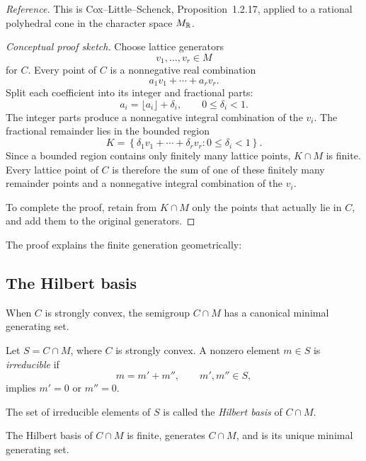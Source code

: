 \noindent
\textit{Reference.}
This is Cox--Little--Schenck, Proposition~1.2.17, applied to a
rational polyhedral cone in the character space \(M_{\mathbb{R}}\).

\begin{proof}[Conceptual proof sketch]
Choose lattice generators
\[
v_1,\ldots,v_r\in M
\]
for \(C\). Every point of \(C\) is a nonnegative real combination
\[
a_1v_1+\cdots+a_rv_r.
\]
Split each coefficient into its integer and fractional parts:
\[
a_i=\lfloor a_i\rfloor+\delta_i,
\qquad
0\leq\delta_i<1.
\]
The integer parts produce a nonnegative integral combination of the
\(v_i\). The fractional remainder lies in the bounded region
\[
K=
\left\{
\delta_1v_1+\cdots+\delta_rv_r:
0\leq\delta_i<1
\right\}.
\]
Since a bounded region contains only finitely many lattice points,
\(K\cap M\) is finite. Every lattice point of \(C\) is therefore the
sum of one of these finitely many remainder points and a nonnegative
integral combination of the \(v_i\).

To complete the proof, retain from \(K\cap M\) only the points that
actually lie in \(C\), and add them to the original generators.
\end{proof}

The proof explains the finite generation geometrically:

\begin{center}
\end{center}

\subsection{The Hilbert basis}

When \(C\) is strongly convex, the semigroup \(C\cap M\) has a
canonical minimal generating set.

\begin{definition}
Let \(S=C\cap M\), where \(C\) is strongly convex. A nonzero element
\(m\in S\) is \emph{irreducible} if
\[
m=m'+m'',
\qquad
m',m''\in S,
\]
implies \(m'=0\) or \(m''=0\).

The set of irreducible elements of \(S\) is called the
\emph{Hilbert basis} of \(C\cap M\).
\end{definition}

\begin{proposition}
\label{prop:hilbert-basis-cone}
The Hilbert basis of \(C\cap M\) is finite, generates \(C\cap M\),
and is its unique minimal generating set.
\end{proposition}

